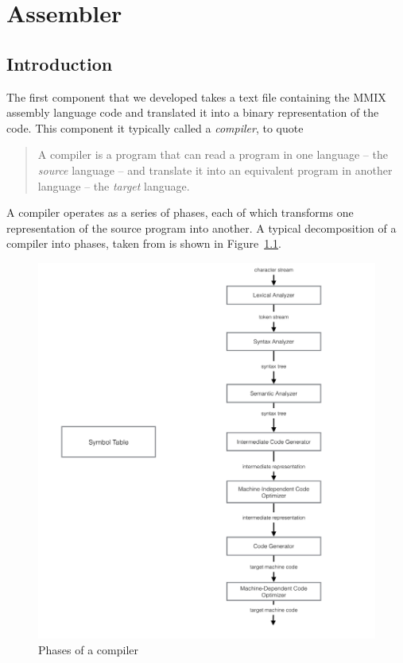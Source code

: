 \documentclass[a4paper,11pt]{report}
\begin{document}
\chapter{Assembler}
\label{c:assembler}
\section{Introduction}
The first component that we developed takes a text file containing the MMIX assembly language code and translated it into a binary representation of the code.  This component it typically called a \textit{compiler}, to quote \cite{dragon}

\begin{quote}
A compiler is a program that can read a program in one language -- the \textit{source} language -- and translate it into an equivalent program in another language -- the \textit{target} language.
\end{quote}

A compiler operates as a series of phases, each of which transforms one representation of the source program into another. A typical decomposition of a compiler into phases, taken from \cite{dragon} is shown in Figure~\ref{CompilerPhases}.
\begin{figure}[ht!]
\centering
\includegraphics[width=\textwidth]{PhasesOfACompiler}
\caption{Phases of a compiler}
\label{CompilerPhases}
\end{figure}
\end{document}
